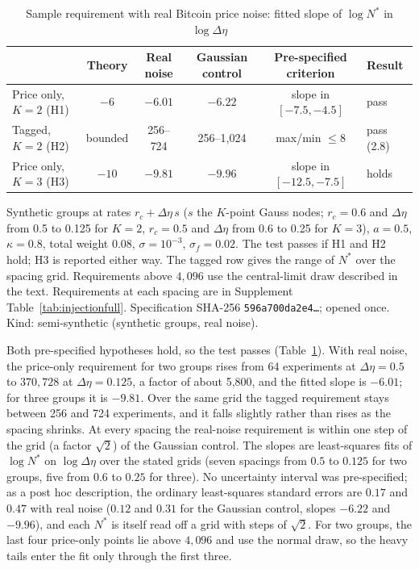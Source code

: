 \documentclass[12pt]{article}
\theoremstyle{definition}
\theoremstyle{remark}
\begin{document}
\begin{table}[t]\centering\small
\begin{threeparttable}
\caption{Sample requirement with real Bitcoin price noise: fitted slope of $\log N^*$ in $\log\Delta\eta$}\label{tab:injection}
\begin{tabular}{lccccl}
\toprule
 & Theory & Real noise & Gaussian control & Pre-specified criterion & Result\\
\midrule
Price only, $K=2$ (H1) & $-6$ & $-6.01$ & $-6.22$ & slope in $[-7.5,-4.5]$ & pass\\
Tagged, $K=2$ (H2) & bounded & 256--724 & 256--1{,}024 & max/min $\le8$ & pass (2.8)\\
Price only, $K=3$ (H3) & $-10$ & $-9.81$ & $-9.96$ & slope in $[-12.5,-7.5]$ & holds\\
\bottomrule
\end{tabular}
\begin{tablenotes}\footnotesize\item Synthetic groups at rates $r_c+\Delta\eta\,s$ ($s$ the $K$-point Gauss nodes; $r_c=0.6$ and $\Delta\eta$ from 0.5 to 0.125 for $K=2$, $r_c=0.5$ and $\Delta\eta$ from 0.6 to 0.25 for $K=3$), $a=0.5$, $\kappa=0.8$, total weight 0.08, $\sigma=10^{-3}$, $\sigma_f=0.02$. The test passes if H1 and H2 hold; H3 is reported either way. The tagged row gives the range of $N^*$ over the spacing grid. Requirements above $4{,}096$ use the central-limit draw described in the text. Requirements at each spacing are in Supplement Table~\ref{tab:injectionfull}. Specification SHA-256 \texttt{596a700da2e4\ldots}; opened once. Kind: semi-synthetic (synthetic groups, real noise).\end{tablenotes}
\end{threeparttable}
\end{table}

Both pre-specified hypotheses hold, so the test passes (Table~\ref{tab:injection}). With real noise, the price-only requirement for two groups rises from 64 experiments at $\Delta\eta=0.5$ to $370{,}728$ at $\Delta\eta=0.125$, a factor of about 5{,}800, and the fitted slope is $-6.01$; for three groups it is $-9.81$. Over the same grid the tagged requirement stays between 256 and 724 experiments, and it falls slightly rather than rises as the spacing shrinks. At every spacing the real-noise requirement is within one step of the grid (a factor $\sqrt2$) of the Gaussian control. The slopes are least-squares fits of $\log N^*$ on $\log\Delta\eta$ over the stated grids (seven spacings from $0.5$ to $0.125$ for two groups, five from $0.6$ to $0.25$ for three). No uncertainty interval was pre-specified; as a post hoc description, the ordinary least-squares standard errors are $0.17$ and $0.47$ with real noise ($0.12$ and $0.31$ for the Gaussian control, slopes $-6.22$ and $-9.96$), and each $N^*$ is itself read off a grid with steps of $\sqrt2$. For two groups, the last four price-only points lie above $4{,}096$ and use the normal draw, so the heavy tails enter the fit only through the first three.
\end{document}
